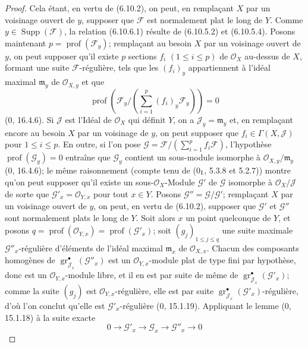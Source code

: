 \begin{proof}
Cela étant, en vertu de (6.10.2), on peut, en remplaçant $X$ par un
voisinage ouvert de $y$, supposer que $\mathcal F$ est normalement plat le
long de $Y$. Comme $y\in\operatorname{Supp}(\mathcal F)$, la relation
(6.10.6.1) résulte de (6.10.5.2) et (6.10.5.4). Posons maintenant
$p=\operatorname{prof}(\mathcal F_y)$; remplaçant au besoin $X$ par un
voisinage ouvert de $y$, on peut supposer qu'il existe $p$ sections $f_i$
$(1\leq i\leq p)$ de $\mathcal O_X$ au-dessus de $X$, formant une suite
$\mathcal F$-régulière, tels que les $(f_i)_y$ appartiennent à l'idéal
maximal $\mathfrak m_y$ de $\mathcal O_{X,y}$ et que
\[
\operatorname{prof}\left(\mathcal F_y/
\left(\sum_{i=1}^{p}(f_i)_y\mathcal F_y\right)\right)=0
\]
(0, 16.4.6). Si $\mathcal J$ est l'Idéal de $\mathcal O_X$ qui définit
$Y$, on a $\mathcal J_y=\mathfrak m_y$ et, en remplaçant encore au besoin $X$
par un voisinage de $y$, on peut supposer que
$f_i\in\Gamma(X,\mathcal J)$ pour $1\leq i\leq p$. En outre, si l'on pose
$\mathcal G=\mathcal F/(\sum_{i=1}^{p}f_i\mathcal F)$, l'hypothèse
$\operatorname{prof}(\mathcal G_y)=0$ entraîne que $\mathcal G_y$ contient
un sous-module isomorphe à
$\mathcal O_{X,y}/\mathfrak m_y$ (0, 16.4.6); le même raisonnement (compte
tenu de (0$_{\rm I}$, 5.3.8 et 5.2.7)) montre qu'on peut supposer qu'il
existe un sous-$\mathcal O_X$-Module $\mathcal G'$ de $\mathcal G$
isomorphe à $\mathcal O_X/\mathcal J$ de sorte que
$\mathcal G'_x=\mathcal O_{Y,x}$ pour tout $x\in Y$. Posons
$\mathcal G''=\mathcal G/\mathcal G'$; remplaçant $X$ par un voisinage
ouvert de $y$, on peut, en vertu de (6.10.2), supposer que $\mathcal G'$ et
$\mathcal G''$ sont normalement plats le long de $Y$. Soit alors $x$ un
point quelconque de $Y$, et posons
$q=\operatorname{prof}(\mathcal O_{Y,x})=\operatorname{prof}(\mathcal G'_x)$;
soit $(g_j)_{1\leq j\leq q}$ une suite maximale
$\mathcal G''_x$-régulière d'éléments de l'idéal maximal
$\mathfrak m_x$ de $\mathcal O_{X,x}$. Chacun des composants homogènes de
$\operatorname{gr}_{\mathcal J_x}^{\bullet}(\mathcal G''_x)$ est un
$\mathcal O_{Y,x}$-module plat de type fini par hypothèse, donc est un
$\mathcal O_{Y,x}$-module libre, et il en est par suite de même de
$\operatorname{gr}_{\mathcal J_x}^{\bullet}(\mathcal G'_x)$; comme la
suite $(g_j)$ est $\mathcal O_{Y,x}$-régulière, elle est par suite
$\operatorname{gr}_{\mathcal J_x}^{\bullet}(\mathcal G'_x)$-régulière,
d'où l'on conclut qu'elle est $\mathcal G'_x$-régulière (0, 15.1.19).
Appliquant le lemme (0, 15.1.18) à la suite exacte
\[
0\longrightarrow\mathcal G'_x\longrightarrow\mathcal G_x
\longrightarrow\mathcal G''_x\longrightarrow0
\]
\end{proof}
